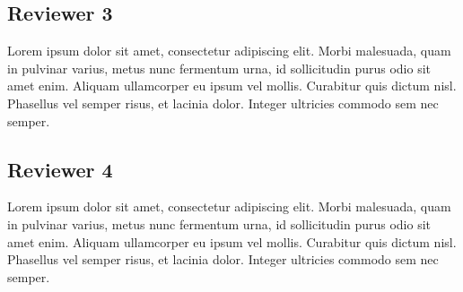 \documentclass[nonacm,sigconf]{acmart}
\begin{document}
\subsection{Reviewer 3}
Lorem ipsum dolor sit amet, consectetur adipiscing elit. Morbi malesuada, quam in pulvinar varius, metus nunc fermentum urna, id sollicitudin purus odio sit amet enim. Aliquam ullamcorper eu ipsum vel mollis. Curabitur quis dictum nisl. Phasellus vel semper risus, et lacinia dolor. Integer ultricies commodo sem nec semper.

\subsection{Reviewer 4}
Lorem ipsum dolor sit amet, consectetur adipiscing elit. Morbi malesuada, quam in pulvinar varius, metus nunc fermentum urna, id sollicitudin purus odio sit amet enim. Aliquam ullamcorper eu ipsum vel mollis. Curabitur quis dictum nisl. Phasellus vel semper risus, et lacinia dolor. Integer ultricies commodo sem nec semper.




%
\end{document}

